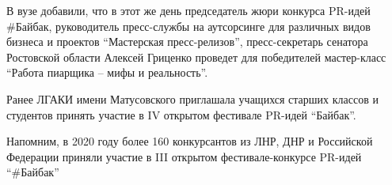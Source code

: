 В вузе добавили, что в этот же день председатель жюри конкурса PR-идей #Байбак,
руководитель пресс-службы на аутсорсинге для различных видов бизнеса и проектов
\enquote{Мастерская пресс-релизов}, пресс-секретарь сенатора Ростовской области
Алексей Гриценко проведет для победителей мастер-класс \enquote{Работа пиарщика
– мифы и реальность}.

Ранее ЛГАКИ имени Матусовского приглашала учащихся старших классов и студентов
принять участие в IV открытом фестивале PR-идей \enquote{Байбак}.

Напомним, в 2020 году более 160 конкурсантов из ЛНР, ДНР и Российской Федерации
приняли участие в III открытом фестивале-конкурсе PR-идей \enquote{\#Байбак}
